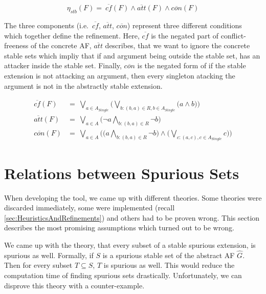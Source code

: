 $$
\eta_{stb}(F) =\ \overline{cf}(F) \land \overline{att}(F) \land \overline{con}(F)
$$


The three components (i.e.\ $\overline{cf}$, $\overline{att}$, $\overline{con}$) represent three different conditions which together define the refinement. Here, $\overline{cf}$ is the negated part of conflict-freeness of the concrete AF, $\overline{att}$ describes, that we want to ignore the concrete stable sets which impliy that if and argument being outside the stable set, has an attacker inside the stable set. Finally, $\overline{con}$ is the negated form of if the stable extension is not attacking an argument, then every singleton atacking the argument is not in the abstractly stable extension.

\begin{align*}
    \overline{cf}(F)&=\ \bigvee_{a \in A_{\mathit{Single}}} \big( \bigvee_{b:(b,a)\in R, b \in A_{\mathit{Single}}} \big( a \land b \big) \big)\\[0.2cm]
    \overline{att}(F)&=\ \bigvee_{a \in A} \big( \lnot a \bigwedge_{b:(b,a)\in R} \lnot b \big)\\[0.2cm]
    \overline{con}(F)&=\ \bigvee_{a \in A} \big( \big( a \bigwedge_{b:(b,a)\in R} \lnot b) \land \big(\bigvee_{c:(a,c), c\in A_{\mathit{Single}}} c\big) \big)
\end{align*}


\section{Relations between Spurious Sets }
\label{sec:ImplementationsDisprovedAssumptions}

When developing the tool, we came up with different theories. Some theories were discarded immediately, some were implemented (recall \cref{sec:HeuristicsAndRefinements}) and others had to be proven wrong. This section describes the most promising assumptions which turned out to be wrong.

We came up with the theory, that every subset of a stable spurious extension, is spurious as well. Formally, if $S$ is a spurious stable set of the abstract AF $\hat{G}$. Then for every subset $T \subseteq S$, $T$ is spurious as well. This would reduce the computation time of finding spurious sets drastically. Unfortunately, we can disprove this theory with a counter-example.

